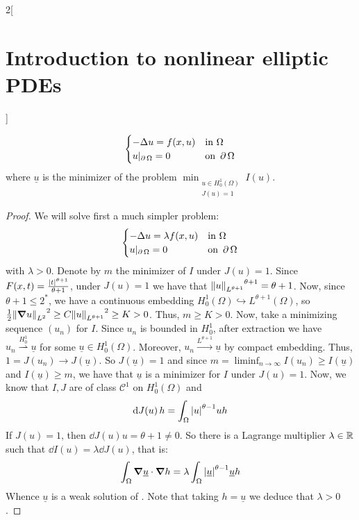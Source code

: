 \documentclass[../../../main_math.tex]{subfiles}
\begin{document}
\begin{multicols}{2}[\section{Introduction to nonlinear elliptic PDEs}]
\begin{proposition}[Aplication]
    \begin{equation}\label{INEPDE:problem_lagrange_apl}
      \begin{cases}
        -\Delta u=f(x,u) & \text{in }\Omega      \\
        u|_{\operatorname{\partial}{\Omega}}=0   & \text{on }\operatorname{\partial}{\Omega}
      \end{cases}
    \end{equation}
    where $\underline{u}$ is the minimizer of the problem
    $\displaystyle
      \min_{\substack{u\in H_0^1(\Omega) \\ J(u)=1}}I(u)
    $.
  \end{proposition}
  \begin{proof}
    We will solve first a much simpler problem:
    \begin{equation}\label{INEPDE:aux_problem_lagrange}
      \begin{cases}
        -\Delta u=\lambda f(x,u) & \text{in }\Omega      \\
        u|_{\operatorname{\partial}{\Omega}}=0           & \text{on }\operatorname{\partial}{\Omega}
      \end{cases}
    \end{equation}
    with $\lambda>0$. Denote by $m$ the minimizer of $I$ under $J(u)=1$. Since $F(x,t)=\frac{\abs{t}^{\theta+1}}{\theta+1}$, under $J(u)=1$ we have that ${\left\|u\right\|_{L^{\theta+1}}}^{\theta+1}=\theta+1$. Now, since $\theta+1\leq 2^*$, we have a continuous embedding $H_0^1(\Omega)\hookrightarrow L^{\theta+1}(\Omega)$, so $\frac{1}{2}{\left\|\grad u\right\|_{L^2}}^2\geq C {\left\|u\right\|_{L^{\theta+1}}}^2\geq K>0$. Thus, $m\geq K>0$. Now, take a minimizing sequence $(u_n)$ for $I$. Since $u_n$ is bounded in $H_0^1$, after extraction we have $u_n\overset{H_0^1}{\rightharpoonup} \underline{u}$ for some $\underline{u}\in H_0^1(\Omega)$. Moreover, $u_n\overset{L^{\theta+1}}{\to} \underline{u}$ by compact embedding. Thus, $1=J(u_n)\to J(\underline{u})$. So $J(\underline{u})=1$ and since $m=\displaystyle\liminf_{n\to\infty}I(u_n)\geq I(\underline{u})$ and $I(\underline{u})\geq m$, we have that $\underline{u}$ is a minimizer for $I$ under $J(u)=1$. Now, we know that $I,J$ are of class $\mathcal{C}^1$ on $H_0^1(\Omega)$ and
    $$
      \dd{J(u)}h = \int_\Omega \abs{u}^{\theta-1}uh
    $$
    If $J(u)=1$, then $\dd{J(u)}u=\theta+1\ne 0$. So there is a Lagrange multiplier $\lambda\in\mathbb{R}$ such that $\dd{I(u)}=\lambda \dd{J(u)}$, that is:
    $$
      \int_\Omega \grad \underline{u}\cdot \grad h=\lambda \int_\Omega \abs{\underline{u}}^{\theta-1}\underline{u}h
    $$
    Whence $\underline{u}$ is a weak solution of . Note that taking $h=\underline{u}$ we deduce that $\lambda>0$.


\end{proof}
\end{multicols}
\end{document}
